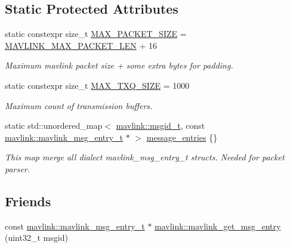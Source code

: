 \subsection*{Static Protected Attributes}
\begin{DoxyCompactItemize}
\item 
static constexpr size\+\_\+t \mbox{\hyperlink{group__mavconn_ga1810847cbd773691c40b73e9ed24455d}{M\+A\+X\+\_\+\+P\+A\+C\+K\+E\+T\+\_\+\+S\+I\+ZE}} = \mbox{\hyperlink{include__v2_80_2mavlink__types_8h_a473ed646f44ca10001777e8f150508a6}{M\+A\+V\+L\+I\+N\+K\+\_\+\+M\+A\+X\+\_\+\+P\+A\+C\+K\+E\+T\+\_\+\+L\+EN}} + 16
\begin{DoxyCompactList}\small\item\em Maximum mavlink packet size + some extra bytes for padding. \end{DoxyCompactList}\item 
static constexpr size\+\_\+t \mbox{\hyperlink{group__mavconn_gaf5e70afd06413dba8c7aee46396f03a1}{M\+A\+X\+\_\+\+T\+X\+Q\+\_\+\+S\+I\+ZE}} = 1000
\begin{DoxyCompactList}\small\item\em Maximum count of transmission buffers. \end{DoxyCompactList}\item 
static std\+::unordered\+\_\+map$<$ \mbox{\hyperlink{namespacemavlink_a98a1fe49b380ed1ea252d2c13bf3278d}{mavlink\+::msgid\+\_\+t}}, const \mbox{\hyperlink{include__v2_80_2mavlink__types_8h_abf009bf897407a543e5209298ad82321}{mavlink\+::mavlink\+\_\+msg\+\_\+entry\+\_\+t}} $\ast$ $>$ \mbox{\hyperlink{group__mavconn_ga95f9336a3630ce53abf1611f5e8a061f}{message\+\_\+entries}} \{\}
\begin{DoxyCompactList}\small\item\em This map merge all dialect mavlink\+\_\+msg\+\_\+entry\+\_\+t structs. Needed for packet parser. \end{DoxyCompactList}\end{DoxyCompactItemize}
\subsection*{Friends}
\begin{DoxyCompactItemize}
\item 
const \mbox{\hyperlink{include__v2_80_2mavlink__types_8h_abf009bf897407a543e5209298ad82321}{mavlink\+::mavlink\+\_\+msg\+\_\+entry\+\_\+t}} $\ast$ \mbox{\hyperlink{group__mavconn_gabc1b20a1cf82d2e9d432f0a5ac140630}{mavlink\+::mavlink\+\_\+get\+\_\+msg\+\_\+entry}} (uint32\+\_\+t msgid)
\end{DoxyCompactItemize}


